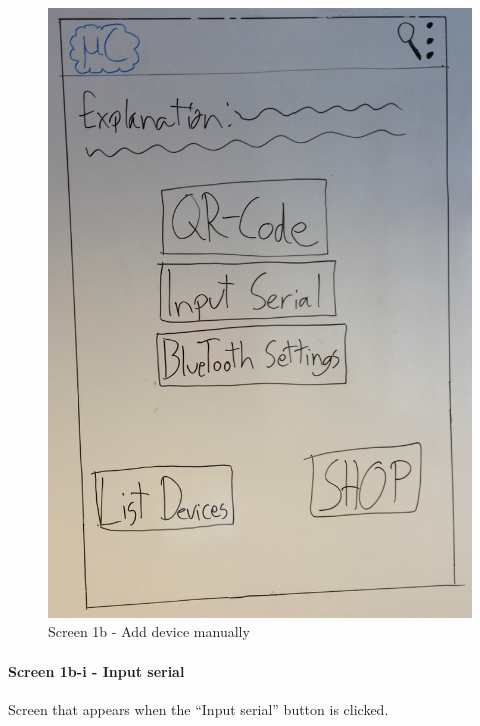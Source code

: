 \begin{figure}[H]
	\centering
		\includegraphics[scale=0.2]{images/Design_guide/Screen1b.png}
	\caption{Screen 1b - Add device manually}
	\label{fig:screen1b}
\end{figure}


\paragraph{Screen 1b-i - Input serial}
Screen that appears when the ``Input serial'' button is clicked.

